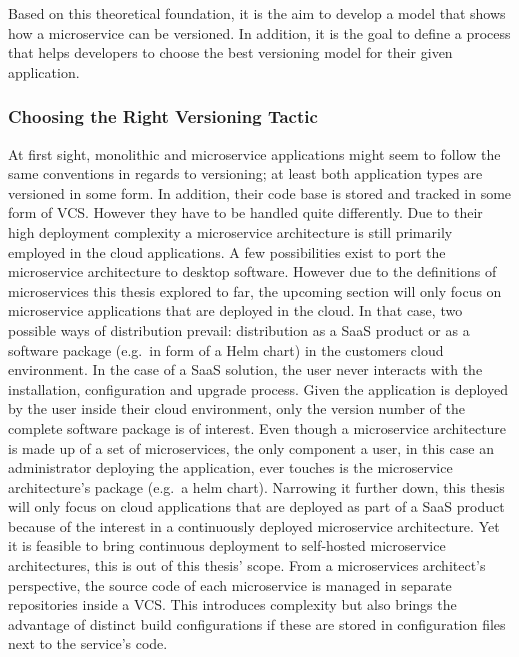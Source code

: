 Based on this theoretical foundation, it is the aim to develop a model that
shows how a microservice can be versioned. In addition, it is the goal to
define a process that helps developers to choose the best versioning model for
their given application.

\subsubsection{Choosing the Right Versioning Tactic}%
\label{ssub:Choosing_the_Right_Versioning_Tactic}

At first sight, monolithic and microservice applications might seem to follow
the same conventions in regards to versioning; at least both application types
are versioned in some form. In addition, their code base is stored and tracked
in some form of \ac{VCS}. However they have to be handled quite differently.
Due to their high deployment complexity a microservice architecture is still
primarily employed in the cloud applications. A few possibilities exist to port
the microservice architecture to desktop software. However due to the
definitions of microservices this thesis explored to far, the upcoming section
will only focus on microservice applications that are deployed in the cloud. In
that case, two possible ways of distribution prevail: distribution as a
\ac{SaaS} product or as a software package (e.g.\ in form of a Helm chart) in
the customers cloud environment. In the case of a \ac{SaaS} solution, the user
never interacts with the installation, configuration and upgrade process. Given
the application is deployed by the user inside their cloud environment, only
the version number of the complete software package is of interest. Even though
a microservice architecture is made up of a set of microservices, the only
component a user, in this case an administrator deploying the application, ever
touches is the microservice architecture's package (e.g.\ a helm chart).
Narrowing it further down, this thesis will only focus on cloud applications
that are deployed as part of a \ac{SaaS} product because of the interest in a
continuously deployed microservice architecture.  Yet it is feasible to bring
continuous deployment to self-hosted microservice architectures, this is out of
this thesis' scope. From a microservices architect's perspective, the source
code of each microservice is managed in separate repositories inside a
\ac{VCS}.  This introduces complexity but also brings the advantage of distinct
build configurations if these are stored in configuration files next to the
service's code.

